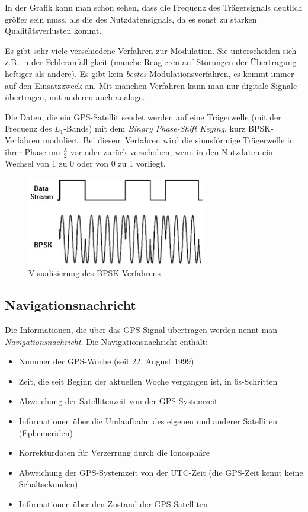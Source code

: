 \documentclass[12pt,a4paper]{scrartcl}
\begin{document}
In der Grafik kann man schon sehen, dass die Frequenz des Trägersignals deutlich größer sein muss, als die des Nutzdatensignals, da es sonst zu starken Qualitätsverlusten kommt.

Es gibt sehr viele verschiedene Verfahren zur Modulation. Sie unterscheiden sich z.B. in der Fehleranfälligkeit (manche Reagieren auf Störungen der Übertragung heftiger als andere). Es gibt kein \emph{bestes} Modulationsverfahren, es kommt immer auf den Einsatzzweck an. Mit manchen Verfahren kann man nur digitale Signale übertragen, mit anderen auch analoge.

Die Daten, die ein GPS-Satellit sendet werden auf eine Trägerwelle (mit der Frequenz des $L_1$-Bands) mit dem \emph{Binary Phase-Shift Keying}, kurz BPSK-Verfahren moduliert.
Bei diesem Verfahren wird die sinusförmige Trägerwelle in ihrer Phase um $\frac{\lambda}{2}$ vor oder zurück verschoben, wenn in den Nutzdaten ein Wechsel von 1 zu 0 oder von 0 zu 1 vorliegt.

\begin{figure}[H]
\centering
\includegraphics[width=0.7\textwidth]{img/bpsk.jpg}
\caption{Visualisierung des BPSK-Verfahrens\cite{evalidate_bpsk}}
\label{fig:bpsk}
\end{figure}

\subsection{Navigationsnachricht}
Die Informationen, die über das GPS-Signal übertragen werden nennt man \emph{Navigationsnachricht}. Die Navigationsnachricht enthält:
\begin{itemize}
\item Nummer der GPS-Woche (seit 22. August 1999)
\item Zeit, die seit Beginn der aktuellen Woche vergangen ist, in 6s-Schritten
\item Abweichung der Satellitenzeit von der GPS-Systemzeit
\item Informationen über die Umlaufbahn des eigenen und anderer Satelliten (Ephemeriden)
\item Korrekturdaten für Verzerrung durch die Ionosphäre
\item Abweichung der GPS-Systemzeit von der UTC-Zeit (die GPS-Zeit kennt keine Schaltsekunden)
\item Informationen über den Zustand der GPS-Satelliten
\end{itemize}
\cite{infotip_gps}
\end{document}
